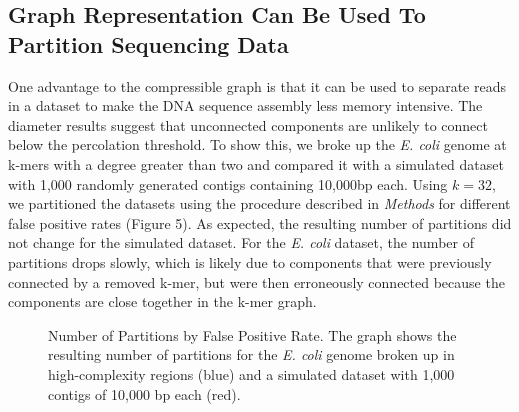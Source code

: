\documentclass[12pt]{article} \usepackage{simplemargins}
\begin{document}
\subsection{Graph Representation Can Be Used To Partition Sequencing Data}
One advantage to the compressible graph is that it can be used to 
separate reads in a dataset to make the DNA sequence assembly less 
memory intensive. The diameter results suggest that unconnected components 
are unlikely to connect below the percolation threshold. To show this, we broke up the  
\emph{E. coli} genome at k-mers with a degree greater than two and compared it 
with a simulated dataset with 1,000 randomly generated contigs containing 
10,000bp each. Using 
$k=32$, we partitioned the datasets using the procedure described in 
\emph{Methods} for different false positive rates (Figure 5). As expected, the 
resulting number of partitions did not change for the simulated dataset. For the 
\emph{E. coli} dataset, the number of partitions drops slowly, which is likely 
due to components that were previously connected by a removed k-mer, but were 
then erroneously connected because the components are close together in the 
k-mer graph.

\begin{figure}
\caption{Number of Partitions by False Positive Rate. The 
graph shows the resulting number of partitions for the 
\emph{E. coli} genome broken up in high-complexity regions (blue) and 
a simulated dataset with 1,000 contigs of 10,000 bp each (red).}
\end{figure}
\end{document}
